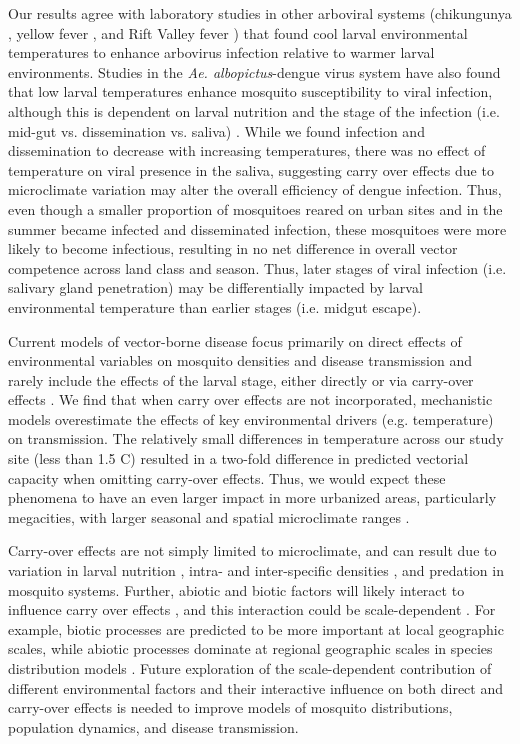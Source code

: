 \documentclass[12pt]{article}
\begin{document}
Our results agree with laboratory studies in other arboviral systems (chikungunya \citep{adelman2013}, yellow fever \citep{adelman2013}, and Rift Valley fever \citep{turell1993}) that found cool larval environmental temperatures to enhance arbovirus infection relative to warmer larval environments. Studies in the \textit{Ae. albopictus}-dengue virus system have also found that low larval temperatures enhance mosquito susceptibility to viral infection, although this is dependent on larval nutrition \citep{buckner2016} and the stage of the infection (i.e. mid-gut vs. dissemination vs. saliva) \citep{alto2013}. While we found infection and dissemination to decrease with increasing temperatures, there was no effect of temperature on viral presence in the saliva, suggesting carry over effects due to microclimate variation may alter the overall efficiency of dengue infection. Thus, even though a smaller proportion of mosquitoes reared on urban sites and in the summer became infected and disseminated infection, these mosquitoes were more likely to become infectious, resulting in no net difference in overall vector competence across land class and season. Thus, later stages of viral infection (i.e. salivary gland penetration) may be differentially impacted by larval environmental temperature than earlier stages (i.e. midgut escape).

Current models of vector-borne disease focus primarily on direct effects of environmental variables on mosquito densities and disease transmission and rarely include the effects of the larval stage, either directly or via carry-over effects \citep{ezeakacha2015}. We find that when carry over effects are not incorporated, mechanistic models overestimate the effects of key environmental drivers (e.g. temperature) on transmission. The relatively small differences in temperature across our study site (less than 1.5 \degree C) resulted in a two-fold difference in predicted vectorial capacity when omitting carry-over effects. Thus, we would expect these phenomena to have an even larger impact in more urbanized areas, particularly megacities, with larger seasonal and spatial microclimate ranges \citep{peng2012}.

Carry-over effects are not simply limited to microclimate, and can result due to variation in larval nutrition \citep{moller-jacobs2014}, intra- and inter-specific densities \citep{alto2005}, and predation \citep{roux2015a} in mosquito systems. Further, abiotic and biotic factors will likely interact to influence carry over effects \citep{buckner2016, muturi2012a}, and this interaction could be scale-dependent \citep{leisnham2014}. For example, biotic processes are predicted to be more important at local geographic scales, while abiotic processes dominate at regional geographic scales in species distribution models \citep{cohen2016}. Future exploration of the scale-dependent contribution of different environmental factors and their interactive influence on both direct and carry-over effects is needed to improve models of mosquito distributions, population dynamics, and disease transmission.
\end{document}
